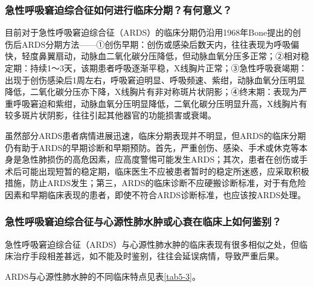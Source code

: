 \subsubsection{急性呼吸窘迫综合征如何进行临床分期？有何意义？}

目前对于急性呼吸窘迫综合征（ARDS）的临床分期仍沿用1968年Bone提出的创伤后ARDS分期方法------①创伤早期：创伤或感染后数天内，往往表现为呼吸偏快，轻度鼻翼扇动，动脉血二氧化碳分压降低，但动脉血氧分压多正常；②相对稳定期：持续1～3天，该期患者呼吸逐渐平稳，X线胸片正常；③急性呼吸衰竭期：出现于创伤感染后1周左右，呼吸窘迫明显、呼吸频速、紫绀，动脉血氧分压明显降低，二氧化碳分压亦下降，X线胸片有非对称斑片状阴影；④终末期：表现为严重呼吸窘迫和紫绀，动脉血氧分压明显降低，二氧化碳分压明显升高，X线胸片有较多斑片状阴影，往往引起其他器官的功能损害或衰竭。

虽然部分ARDS患者病情进展迅速，临床分期表现并不明显，但ARDS的临床分期仍有助于ARDS的早期诊断和早期预防。首先，严重创伤、感染、手术或休克等本身是急性肺损伤的高危因素，应高度警惕可能发生ARDS；其次，患者在创伤或手术后可能出现短暂的稳定期，临床医生不应被患者暂时的稳定所迷惑，应采取积极措施，防止ARDS发生；第三，ARDS的临床诊断不应硬搬诊断标准，对于有危险因素和早期临床表现的患者，即使不符合ARDS诊断标准，也应该按ARDS处理。

\subsubsection{急性呼吸窘迫综合征与心源性肺水肿或心衰在临床上如何鉴别？}

急性呼吸窘迫综合征（ARDS）与心源性肺水肿的临床表现有很多相似之处，但临床治疗手段相差甚远，如不能及时鉴别，往往会延误病情，导致严重后果。

ARDS与心源性肺水肿的不同临床特点见表\ref{tab5-3}。

